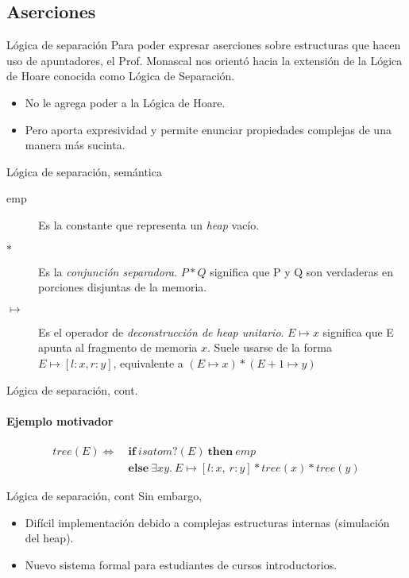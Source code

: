 \subsection*{Aserciones}
\begin{frame}{Lógica de separación}
Para poder expresar aserciones sobre estructuras que hacen uso de apuntadores, 
el Prof. Monascal nos orientó hacia la extensión de la Lógica de Hoare conocida 
como Lógica de Separación.

\begin{itemize}
  \item No le agrega poder a la Lógica de Hoare.
  \item Pero aporta expresividad y permite enunciar propiedades complejas de 
  una manera más sucinta.
 \end{itemize}
\end{frame}

\begin{frame}{Lógica de separación, semántica}

\begin{description}
  \item [emp] Es la constante que representa un \textit{heap} vacío. 
  \item [$*$] Es la \textit{conjunción separadora}. $P*Q$ significa que P y Q son verdaderas en porciones disjuntas de la memoria.
  \item [$\mapsto$] Es el operador de \textit{deconstrucción de heap unitario}. $E \mapsto x$ significa que E apunta al fragmento de memoria $x$. Suele usarse de la forma $E \mapsto [l : x, r : y]$, equivalente a $(E \mapsto x) * (E + 1 \mapsto y)$
\end{description}

\end{frame}

\begin{frame}{Lógica de separación, cont.}
\framesubtitle{Ejemplo motivador}

\begin{align*}
  tree(E) \Longleftrightarrow\ &\boldsymbol{if}\ isatom?(E)\ \boldsymbol{then}\ emp \\
             &\boldsymbol{else}\ \exists xy.\ E\mapsto[l: x,\ r: y] * tree(x) * tree(y) \nonumber
\end{align*}

\end{frame}

\begin{frame}{Lógica de separación, cont}
Sin embargo,
\begin{itemize}
  \item Difícil implementación debido a complejas estructuras internas (simulación del heap).
  \item Nuevo sistema formal para estudiantes de cursos introductorios. 
\end{itemize}
\end{frame}

